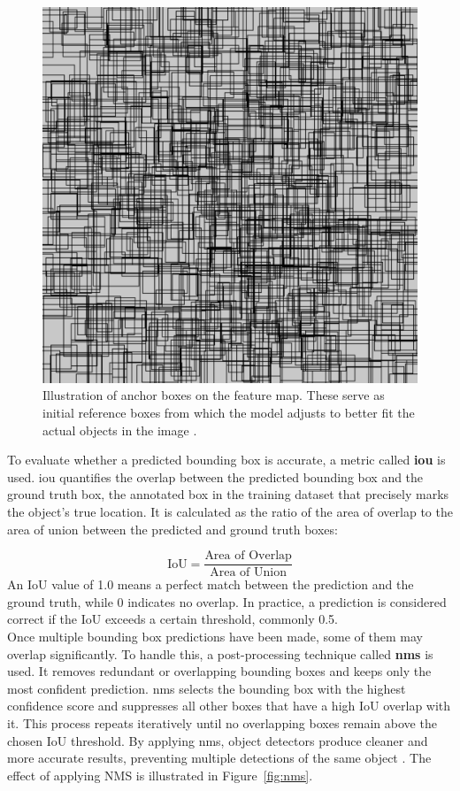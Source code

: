 \begin{figure}[h!]
    \centering
    \includegraphics[width=0.7\linewidth]{figures/theory/image-recognition/anchor-boxes.png}
    \caption[Anchor boxes in object detection]{Illustration of anchor boxes on the feature map. These serve as initial reference boxes from which the model adjusts to better fit the actual objects in the image \cite{thinkautonomous:anchorboxes}.}
    \label{fig:anchor-box}
\end{figure}


To evaluate whether a predicted bounding box is accurate, a metric called \textbf{\gls{iou}} is used. \gls{iou} quantifies the overlap between the predicted bounding box and the ground truth box, the annotated box in the training dataset that precisely marks the object's true location. It is calculated as the ratio of the area of overlap to the area of union between the predicted and ground truth boxes:

\[
\text{IoU} = \frac{\text{Area of Overlap}}{\text{Area of Union}}
\]
An IoU value of 1.0 means a perfect match between the prediction and the ground truth, while 0 indicates no overlap. In practice, a prediction is considered correct if the IoU exceeds a certain threshold, commonly 0.5. \\


 Once multiple bounding box predictions have been made, some of them may overlap significantly. To handle this, a post-processing technique called \textbf{\gls{nms}} is used. It removes redundant or overlapping bounding boxes and keeps only the most confident prediction. \gls{nms} selects the bounding box with the highest confidence score and suppresses all other boxes that have a high IoU overlap with it. This process repeats iteratively until no overlapping boxes remain above the chosen IoU threshold. By applying \gls{nms}, object detectors produce cleaner and more accurate results, preventing multiple detections of the same object
\cite{thepythoncode:nms}. The effect of applying NMS is illustrated in Figure~\ref{fig:nms}.


